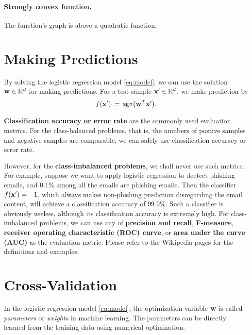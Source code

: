 \documentclass[11pt]{article}
\numberwithin{equation}{section}
\def\w{{\bf w}}
\def\x{{\bf x}}
\def\RB{{\mathbb R}}
\def\sgn{\mathsf{sgn}}
\begin{document}
\paragraph{Strongly convex function.}
The function's graph is above a quadratic function.


\section{Making Predictions} \label{sec:predict}



By solving the logistic regression model \eqref{eq:model}, 
we can use the solution $\w \in \RB^d$ for making predictions.
For a test sample $\x' \in \RB^d$, we make prediction by
\begin{equation*}
f (\x')
\: = \: \sgn \big(  \w^T \x' \big) .
\end{equation*}

{\bf Classification accuracy or error rate} are the commonly used evaluation metrics.
For the class-balanced problems, that is, the numbers of postive samples and negative samples are comparable,
we can safely use classification accuracy or error rate.

However, for the {\bf class-imbalanced problems}, we shall never use such metrics.
For example, suppose we want to apply logistic regression to dectect phishing emails,
and $0.1\%$ among all the emails are phishing emails.
Then the classifier $f (\x') = -1$, which always makes non-phishing prediction disregarding the email content, will achieve a classification accuracy of $99.9\%$.
Such a classifier is obviously useless, although its classification accuracy is extremely high.
For class-imbalanced problems, we can use any of {\bf precision and recall}, {\bf F-measure}, {\bf receiver operating characteristic (ROC) curve}, or {\bf area under the curve (AUC)} as the evaluation metric.
Please refer to the Wikipedia pages for the definitions and examples.


\section{Cross-Validation}



In the logistic regression model \eqref{eq:model}, the optimization variable $\w$ is called {\it parameters} or {\it weights} in machine learning.
The parameters can be directly learned from the training data using numerical optimization.
\end{document}
